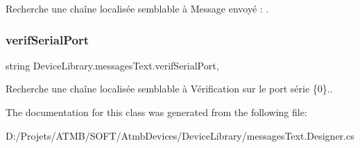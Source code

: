 Recherche une chaîne localisée semblable à Message envoyé \+: . 

\mbox{\label{class_device_library_1_1messages_text_aa2c6c9e22c64621ad6e50951e6233abd}} 
\subsubsection{\texorpdfstring{verif\+Serial\+Port}{verifSerialPort}}
{\footnotesize\ttfamily string Device\+Library.\+messages\+Text.\+verif\+Serial\+Port\hspace{0.3cm}{\ttfamily [static]}, {\ttfamily [get]}}



Recherche une chaîne localisée semblable à Vérification sur le port série \{0\}.. 



The documentation for this class was generated from the following file\+:\begin{DoxyCompactItemize}
\item 
D\+:/\+Projets/\+A\+T\+M\+B/\+S\+O\+F\+T/\+Atmb\+Devices/\+Device\+Library/messages\+Text.\+Designer.\+cs\end{DoxyCompactItemize}
